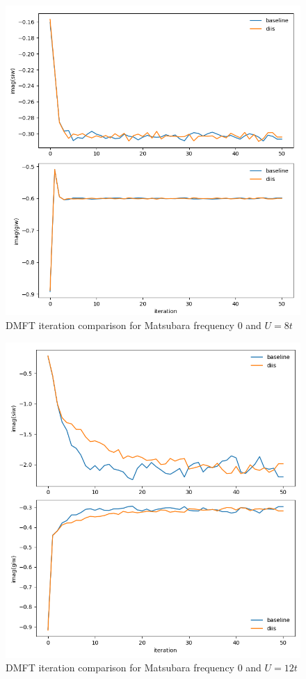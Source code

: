 \begin{figure}[H]
    \centering
    \includegraphics[width=1.0\textwidth]{figures/square_u08_b50_siw_imag_giw_imag.png}
    \caption{DMFT iteration comparison for Matsubara frequency 0 and $U=8t$}
    \label{fig:eval-diis-u8}
\end{figure}

\begin{figure}[H]
    \centering
    \includegraphics[width=1.0\textwidth]{figures/square_u12_b50_siw_imag_giw_imag.png}
    \caption{DMFT iteration comparison for Matsubara frequency 0 and $U=12t$}
    \label{fig:eval-diis-u12}
\end{figure}

